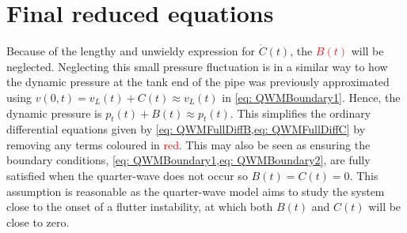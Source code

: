 



%

\section{Final reduced equations} \label{subsec: QWMFinalDimensional}


Because of the lengthy and unwieldy expression for $\dot{C}(t)$, the \textcolor{Red}{$B(t)$} will be neglected. Neglecting this small pressure fluctuation is in a similar way to how the dynamic pressure at the tank end of the pipe was previously approximated using $v(0,t) = v_L(t) + C(t) \approx v_L(t)$ in \cref{eq: QWMBoundary1}. Hence, the dynamic pressure is $p_t(t) + B(t) \approx p_t(t)$. This simplifies the ordinary differential equations given by \cref{eq: QWMFullDiffB,eq: QWMFullDiffC} by removing any terms coloured in \textcolor{Red}{red}. This may also be seen as ensuring the boundary conditions, \cref{eq: QWMBoundary1,eq: QWMBoundary2}, are fully satisfied when the quarter-wave does not occur so $B(t) = C(t) = 0$. This assumption is reasonable as the quarter-wave model aims to study the system close to the onset of a flutter instability, at which both $B(t)$ and $C(t)$ will be close to zero.

